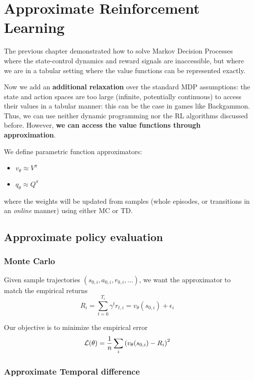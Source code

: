 \documentclass[../course-notes.tex]{subfiles}
\begin{document}
\chapter{Approximate Reinforcement Learning}\label{chap:approxRL}


The previous chapter demonstrated how to solve Markov Decision Processes where the state-control dynamics and reward signals are inaccessible, but where we are in a tabular setting where the value functions can be represented exactly.

Now we add an \textbf{additional relaxation} over the standard MDP assumptions: the state and action spaces are too large (infinite, potentially continuous) to access their values in a tabular manner: this can be the case in games like Backgammon.
Thus, we can use neither dynamic programming nor the RL algorithms discussed before. However, \textbf{\bluefont we can access the value functions through approximation}.

We define parametric function approximators:
\begin{itemize}
	\item $v_\theta \approx V^\pi$
	\item $q_\theta \approx Q^\pi$
\end{itemize}
where the weights will be updated from samples (whole episodes, or transitions in an \textit{online} manner) using either MC or TD.




\section{Approximate policy evaluation}

\subsection{Monte Carlo}

Given sample trajectories $(s_{0,i}, a_{0,i},r_{0,i},\ldots)$, we want the approximator to match the empirical returns
\[
	R_i = \sum_{t=0}^{T_i} \gamma^t r_{t,i} = v_\theta(s_{0,i}) + \epsilon_i
\]

Our objective is to minimize the empirical error
\begin{equation}
	\mathcal{L}(\theta) = \frac{1}{n}
	\sum_i {(v_\theta(s_{0,i}) - R_i)}^2
\end{equation}


\subsection{Approximate Temporal difference}
\end{document}
